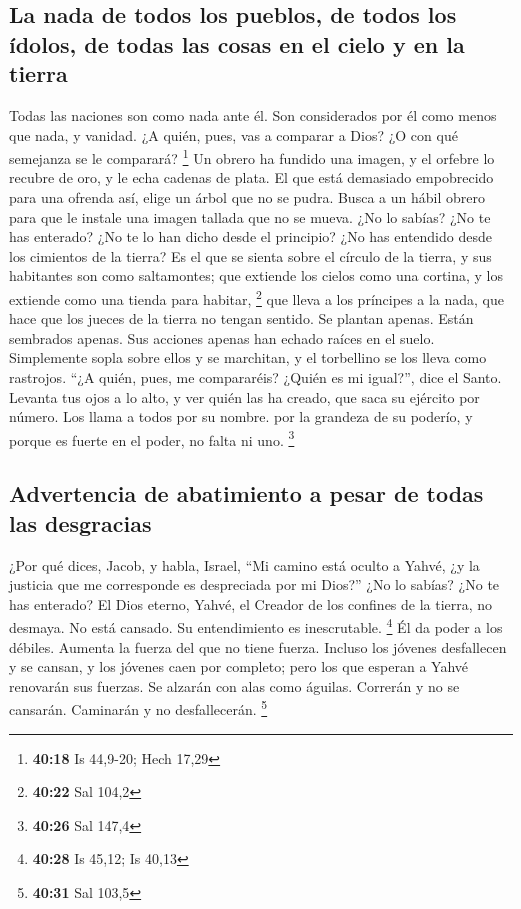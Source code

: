 \begin{paracol}{2}
\hypertarget{la-nada-de-todos-los-pueblos-de-todos-los-uxeddolos-de-todas-las-cosas-en-el-cielo-y-en-la-tierra}{%
\subsection{La nada de todos los pueblos, de todos los ídolos, de todas
las cosas en el cielo y en la
tierra}\label{la-nada-de-todos-los-pueblos-de-todos-los-uxeddolos-de-todas-las-cosas-en-el-cielo-y-en-la-tierra}}

 Todas las naciones son como nada ante él. Son
considerados por él como menos que nada, y vanidad.  ¿A
quién, pues, vas a comparar a Dios? ¿O con qué semejanza se le
comparará? \footnote{\textbf{40:18} Is 44,9-20; Hech 17,29}
 Un obrero ha fundido una imagen, y el orfebre lo recubre
de oro, y le echa cadenas de plata.  El que está
demasiado empobrecido para una ofrenda así, elige un árbol que no se
pudra. Busca a un hábil obrero para que le instale una imagen tallada
que no se mueva.  ¿No lo sabías? ¿No te has enterado? ¿No
te lo han dicho desde el principio? ¿No has entendido desde los
cimientos de la tierra?  Es el que se sienta sobre el
círculo de la tierra, y sus habitantes son como saltamontes; que
extiende los cielos como una cortina, y los extiende como una tienda
para habitar, \footnote{\textbf{40:22} Sal 104,2}  que
lleva a los príncipes a la nada, que hace que los jueces de la tierra no
tengan sentido.  Se plantan apenas. Están sembrados
apenas. Sus acciones apenas han echado raíces en el suelo. Simplemente
sopla sobre ellos y se marchitan, y el torbellino se los lleva como
rastrojos.  ``¿A quién, pues, me compararéis? ¿Quién es
mi igual?'', dice el Santo.  Levanta tus ojos a lo alto,
y ver quién las ha creado, que saca su ejército por número. Los llama a
todos por su nombre. por la grandeza de su poderío, y porque es fuerte
en el poder, no falta ni uno. \footnote{\textbf{40:26} Sal 147,4}

\hypertarget{advertencia-de-abatimiento-a-pesar-de-todas-las-desgracias}{%
\subsection{Advertencia de abatimiento a pesar de todas las
desgracias}\label{advertencia-de-abatimiento-a-pesar-de-todas-las-desgracias}}

 ¿Por qué dices, Jacob, y habla, Israel, ``Mi camino está
oculto a Yahvé, ¿y la justicia que me corresponde es despreciada por mi
Dios?''  ¿No lo sabías? ¿No te has enterado? El Dios
eterno, Yahvé, el Creador de los confines de la tierra, no desmaya. No
está cansado. Su entendimiento es inescrutable. \footnote{\textbf{40:28}
  Is 45,12; Is 40,13}  Él da poder a los débiles. Aumenta
la fuerza del que no tiene fuerza.  Incluso los jóvenes
desfallecen y se cansan, y los jóvenes caen por completo;
 pero los que esperan a Yahvé renovarán sus fuerzas. Se
alzarán con alas como águilas. Correrán y no se cansarán. Caminarán y no
desfallecerán. \footnote{\textbf{40:31} Sal 103,5}


\end{paracol}
